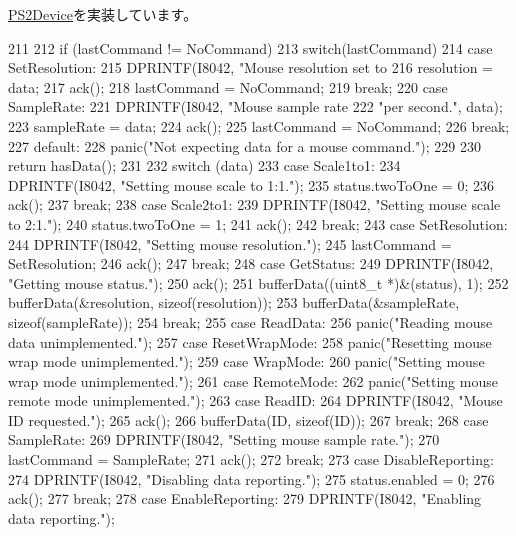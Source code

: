\hyperlink{classX86ISA_1_1PS2Device_a7bfab1b5725d41896d0cd06793244ab7}{PS2Device}を実装しています。


\begin{DoxyCode}
211 {
212     if (lastCommand != NoCommand) {
213         switch(lastCommand) {
214           case SetResolution:
215             DPRINTF(I8042, "Mouse resolution set to %
216             resolution = data;
217             ack();
218             lastCommand = NoCommand;
219             break;
220           case SampleRate:
221             DPRINTF(I8042, "Mouse sample rate %
222                     "per second.\n", data);
223             sampleRate = data;
224             ack();
225             lastCommand = NoCommand;
226             break;
227           default:
228             panic("Not expecting data for a mouse command.\n");
229         }
230         return hasData();
231     }
232     switch (data) {
233       case Scale1to1:
234         DPRINTF(I8042, "Setting mouse scale to 1:1.\n");
235         status.twoToOne = 0;
236         ack();
237         break;
238       case Scale2to1:
239         DPRINTF(I8042, "Setting mouse scale to 2:1.\n");
240         status.twoToOne = 1;
241         ack();
242         break;
243       case SetResolution:
244         DPRINTF(I8042, "Setting mouse resolution.\n");
245         lastCommand = SetResolution;
246         ack();
247         break;
248       case GetStatus:
249         DPRINTF(I8042, "Getting mouse status.\n");
250         ack();
251         bufferData((uint8_t *)&(status), 1);
252         bufferData(&resolution, sizeof(resolution));
253         bufferData(&sampleRate, sizeof(sampleRate));
254         break;
255       case ReadData:
256         panic("Reading mouse data unimplemented.\n");
257       case ResetWrapMode:
258         panic("Resetting mouse wrap mode unimplemented.\n");
259       case WrapMode:
260         panic("Setting mouse wrap mode unimplemented.\n");
261       case RemoteMode:
262         panic("Setting mouse remote mode unimplemented.\n");
263       case ReadID:
264         DPRINTF(I8042, "Mouse ID requested.\n");
265         ack();
266         bufferData(ID, sizeof(ID));
267         break;
268       case SampleRate:
269         DPRINTF(I8042, "Setting mouse sample rate.\n");
270         lastCommand = SampleRate;
271         ack();
272         break;
273       case DisableReporting:
274         DPRINTF(I8042, "Disabling data reporting.\n");
275         status.enabled = 0;
276         ack();
277         break;
278       case EnableReporting:
279         DPRINTF(I8042, "Enabling data reporting.\n");
}}
\end{DoxyCode}
